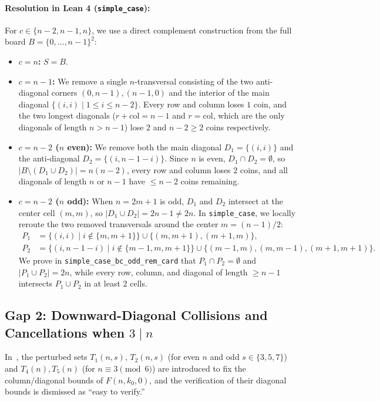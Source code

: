 \documentclass[11pt,a4paper]{article}
\theoremstyle{remark}
\begin{document}
\paragraph{Resolution in Lean 4 (\texttt{simple\_case}):}
For $c \in \{n - 2, n - 1, n\}$, we use a direct complement construction from the full board $B = \{0, \dots, n-1\}^2$:
\begin{itemize}
  \item \textbf{$c = n$:} $S = B$.
  \item \textbf{$c = n - 1$:} We remove a single $n$-transversal consisting of the two anti-diagonal corners $(0, n-1), (n-1, 0)$ and the interior of the main diagonal $\{(i, i) \mid 1 \le i \le n - 2\}$. Every row and column loses $1$ coin, and the two longest diagonals ($r + \mathrm{col} = n - 1$ and $r = \mathrm{col}$, which are the only diagonals of length $n > n - 1$) lose $2$ and $n - 2 \ge 2$ coins respectively.
  \item \textbf{$c = n - 2$ ($n$ even):} We remove both the main diagonal $D_1 = \{(i, i)\}$ and the anti-diagonal $D_2 = \{(i, n - 1 - i)\}$. Since $n$ is even, $D_1 \cap D_2 = \emptyset$, so $|B \setminus (D_1 \cup D_2)| = n(n - 2)$, every row and column loses $2$ coins, and all diagonals of length $n$ or $n - 1$ have $\le n - 2$ coins remaining.
  \item \textbf{$c = n - 2$ ($n$ odd):} When $n = 2m + 1$ is odd, $D_1$ and $D_2$ intersect at the center cell $(m, m)$, so $|D_1 \cup D_2| = 2n - 1 \ne 2n$. In \texttt{simple\_case}, we locally reroute the two removed transversals around the center $m = (n - 1)/2$:
  \begin{align*}
    P_1 &= \{(i, i) \mid i \notin \{m, m+1\}\} \cup \{(m, m+1), (m+1, m)\}, \\
    P_2 &= \{(i, n - 1 - i) \mid i \notin \{m-1, m, m+1\}\} \cup \{(m-1, m), (m, m-1), (m+1, m+1)\}.
  \end{align*}
  We prove in \texttt{simple\_case\_bc\_odd\_rem\_card} that $P_1 \cap P_2 = \emptyset$ and $|P_1 \cup P_2| = 2n$, while every row, column, and diagonal of length $\ge n - 1$ intersects $P_1 \cup P_2$ in at least $2$ cells.
\end{itemize}

\subsection{Gap 2: Downward-Diagonal Collisions and Cancellations when $3 \mid n$}

In~\cite{LLW1990}, the perturbed sets $T_1(n, s)$, $T_2(n, s)$ (for even $n$ and odd $s \in \{3, 5, 7\}$) and $T_4(n), T_5(n)$ (for $n \equiv 3 \pmod 6$) are introduced to fix the column/diagonal bounds of $F(n, k_0, 0)$, and the verification of their diagonal bounds is dismissed as ``easy to verify.''
\end{document}
